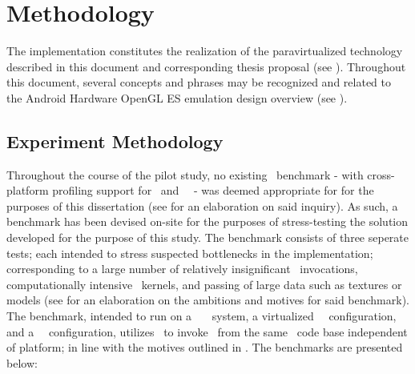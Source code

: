 
\chapter{Methodology}
\label{cha:methodology}
The implementation constitutes the realization of the paravirtualized technology described in this document and corresponding thesis proposal (see ).
Throughout this document, several concepts and phrases may be recognized and related to the Android Hardware OpenGL ES emulation design overview (see ).


\section{Experiment Methodology}
\label{sec:methodology_experimentmethodology}
Throughout the course of the pilot study, no existing \dvttermopenglestwopointo\ benchmark - with cross-platform profiling support for \dvttermandroid\ and \dvttermxeleven\ \dvttermlinux\ - was deemed appropriate for for the purposes of this dissertation (see  for an elaboration on said inquiry).
As such, a benchmark has been devised on-site for the purposes of stress-testing the solution developed for the purpose of this study.
The benchmark consists of three seperate tests; each intended to stress suspected bottlenecks in the implementation; corresponding to a large number of relatively insignificant \dvttermopengl\ invocations, computationally intensive \dvttermgpu\ kernels, and passing of large data such as textures or models (see  for an elaboration on the ambitions and motives for said benchmark).
The benchmark, intended to run on a \dvttermhost\ \dvttermfedora\ \dvttermlinux\ system, a virtualized \dvttermsimics\ \dvttermfedora\ configuration, and a \dvttermqemu\ \dvttermandroid\ configuration, utilizes \dvttermjni\ to invoke \dvttermopengles\ from the same \dvttermc\ code base independent of platform; in line with the motives outlined in .
The benchmarks are presented below:

